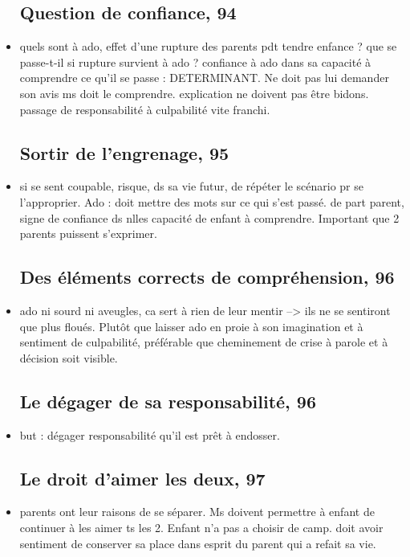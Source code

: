 \documentclass[12pt]{report}
\begin{document}
\begin{itemize}
\subsection{Question de confiance, 94}

\item quels sont à ado, effet d'une rupture des parents pdt tendre enfance ? que se passe-t-il si rupture survient à ado ? confiance à ado dans sa capacité à comprendre ce qu'il se passe : DETERMINANT. Ne doit pas lui demander son avis ms doit le comprendre. explication ne doivent pas être bidons. passage de responsabilité à culpabilité vite franchi.\\


\subsection{Sortir de l'engrenage, 95}

\item si se sent coupable, risque, ds sa vie futur, de répéter le scénario pr se l'approprier.  Ado : doit mettre des mots sur ce qui s'est passé.  de part parent, signe de confiance ds nlles capacité de enfant à comprendre. Important que 2 parents puissent s'exprimer. 

\subsection{Des éléments corrects de compréhension, 96}

\item ado ni sourd ni aveugles, ca sert à rien de leur mentir --> ils ne se sentiront que plus floués.  Plutôt que laisser ado en proie à son imagination et à sentiment de culpabilité, préférable que cheminement de crise à parole et à décision soit visible. 

\subsection{Le dégager de sa responsabilité, 96}
\item but : dégager responsabilité qu'il est prêt à endosser. 

\subsection{Le droit d'aimer les deux, 97}
\item parents ont leur raisons de se séparer. Ms doivent permettre à enfant de continuer à les aimer ts les 2.  Enfant n'a pas a choisir de camp.  doit avoir sentiment de conserver sa place dans esprit du parent qui a refait sa vie.



\end{itemize}
\end{document}
